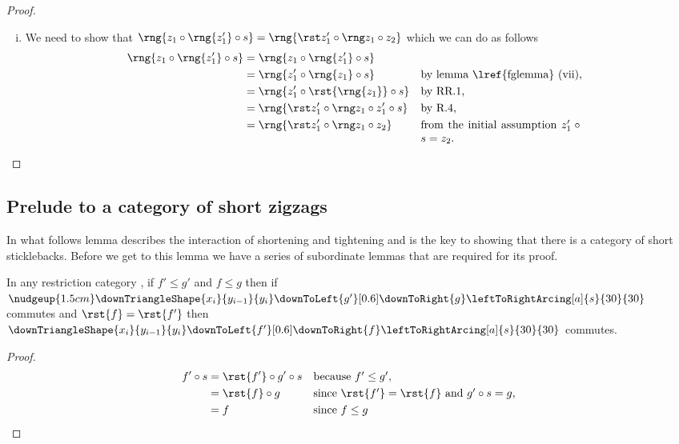 {\begin{proof}
\begin{enumerate}[(i)]
\item %
We need to show that 
$\rng{z_1 \circ \rng{z'_1} \circ s} 
     =\rng{\rstTightener{z}{1} \circ z_2}$ 
which we can do as follows
\begin{align*}
\rng{z_1 \circ \rng{z'_1} \circ s} &= \rng{z_1 \circ \rng{z'_1} \circ s}\\
         &= \rng{z'_1 \circ \rng{z_1} \circ s}
            && \mbox{by lemma \lref{fglemma} (vii),}\\
         &= \rng{z'_1 \circ \rst{\rng{z_1}} \circ s}
            && \mbox{by RR.1,}\\
         &= \rng{
                    \rstTightener{z}{1}
                    \circ z'_1 \circ s
                 }
            &&\mbox{by R.4,}\\
         &= \rng{\rstTightener{z}{1} \circ z_2 }
            &&\parbox[t]{5cm}{from the initial assumption  $z'_1 \circ s = z_2$.} 
\end{align*}
\end{enumerate}
\end{proof}

\subsection{Prelude to a category of short zigzags}

In what follows lemma 
describes the interaction of shortening and tightening 
and is the key to showing that there is a category of short sticklebacks. Before we get to this lemma we have a series of
subordinate lemmas that are required for its proof. 
 
\begin{lemma}
In any restriction category \catcw, 
if $f' \leq g'$ and $f \leq g$ then if  
$\nudgeup{1.5cm} %
\downTriangleShape{x_i}{y_{i-1}}{y_i}
\downToLeft{g'}[0.6]
\downToRight{g}
\leftToRightArcing[a]{s}{30}{30} 
$ commutes 
and $\rst{f}=\rst{f'}$ then
$\downTriangleShape{x_i}{y_{i-1}}{y_i}
\downToLeft{f'}[0.6]
\downToRight{f}
\leftToRightArcing[a]{s}{30}{30} 
$ commutes.
\end{lemma}
\begin{proof}
\begin{align}
f' \circ s 
   &= \rst{f'} \circ g'\circ s 
       && \mbox{because $f' \leq g'$,}\\
   &= \rst{f} \circ g 
   && \mbox{since $\rst{f'}=\rst{f}$ 
              and $g' \circ s = g$, }\\
   &= f
   &&\mbox{since $f \leq g$}
\end{align}
\end{proof}

}
